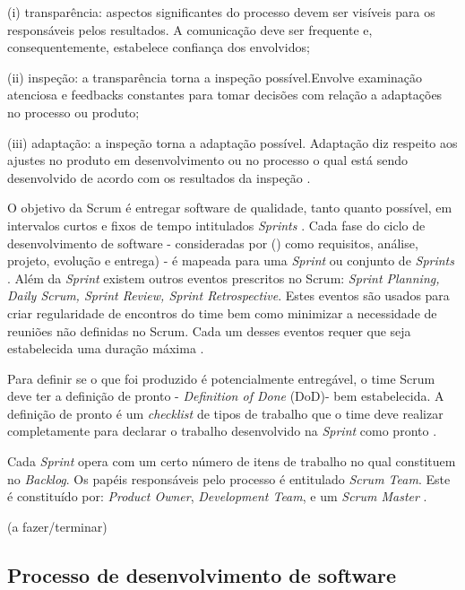 \par (i) transparência: aspectos significantes do processo devem ser visíveis para os responsáveis pelos resultados. A comunicação deve ser frequente e, consequentemente, estabelece confiança dos envolvidos;
\par (ii) inspeção: a transparência torna a inspeção possível.Envolve examinação atenciosa e feedbacks constantes para tomar decisões com relação a adaptações no processo ou produto;
\par (iii) adaptação: a inspeção torna a adaptação possível. Adaptação diz respeito aos ajustes no produto em desenvolvimento ou no processo o qual está sendo desenvolvido de acordo com os resultados da inspeção \cite{rubin2012}.

O objetivo da Scrum é entregar software de qualidade, tanto quanto possível, em intervalos curtos e fixos de tempo intitulados \textit{Sprints} \cite{beedle1999}. Cada fase do ciclo de desenvolvimento de software - consideradas por \citeauthor{beedle1999} (\citeyear{beedle1999}) como requisitos, análise, projeto, evolução e entrega) - é mapeada para uma \textit{Sprint} ou conjunto de \textit{Sprints} \cite{beedle1999}. Além da \textit{Sprint} existem outros eventos prescritos no Scrum: \textit{Sprint Planning, Daily Scrum, Sprint Review, Sprint Retrospective}. Estes eventos são usados para criar regularidade de encontros do time bem como minimizar a necessidade de reuniões não definidas no Scrum. Cada um desses eventos requer que seja estabelecida uma duração máxima \cite{beedle1999}.

Para definir se o que foi produzido é potencialmente entregável, o time Scrum deve ter a definição de pronto - \textit{Definition of Done} (DoD)- bem estabelecida. A definição de pronto é um \textit{checklist} de tipos de trabalho que o time deve realizar completamente para declarar o trabalho desenvolvido na \textit{Sprint} como pronto \cite{rubin2012}.

Cada \textit{Sprint} opera com um certo número de itens de trabalho no qual constituem no \textit{Backlog}. Os papéis responsáveis pelo processo é entitulado \textit{Scrum Team}. Este é constituído por: \textit{Product Owner}, \textit{Development Team}, e um \textit{Scrum Master} \cite{beedle1999}.

(a fazer/terminar)


\subsection{Processo de desenvolvimento de software}

